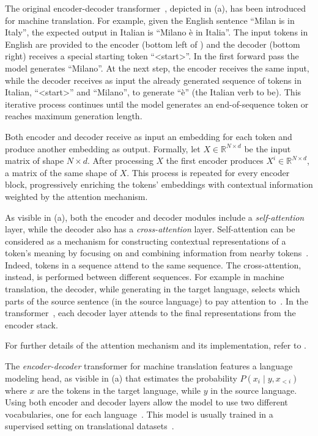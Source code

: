 The original encoder-decoder transformer~\cite{vaswani_transformers_2017}, depicted in (a), has been introduced for machine translation. For example, given the English sentence ``Milan is in Italy'', the expected output in Italian is ``Milano è in Italia''. 
The input tokens in English are provided to the encoder (bottom left of ) and the decoder (bottom right) receives a special starting token ``<start>''. In the first forward pass the model generates ``Milano''. At the next step, the encoder receives the same input, while the decoder receives as input the already generated sequence of tokens in Italian, ``<start>'' and ``Milano'', to generate ``è'' (the Italian verb to be). This iterative process continues until the model generates an end-of-sequence token or reaches maximum generation length.


Both encoder and decoder receive as input an embedding for each token and produce another embedding as output. Formally, let $X \in \mathbb{R}^{N \times d}$ be the input matrix of shape $N \times d$. After processing $X$ the first encoder produces $X^i \in \mathbb{R}^{N \times d}$, a matrix of the same shape of $X$. This process is repeated for every encoder block, progressively enriching the tokens' embeddings with contextual information weighted by the attention mechanism. 

As visible in (a), both the encoder and decoder modules include a \emph{self-attention} layer, while the decoder also has a \emph{cross-attention} layer.
Self-attention can be considered as a mechanism for constructing contextual representations of a token's meaning by focusing on and combining information from nearby tokens~\cite{jm3}. Indeed, tokens in a sequence attend to the same sequence.
The cross-attention, instead, is performed between different sequences. For example in machine translation, the decoder, while generating in the target language, selects which parts of the source sentence (in the source language) to pay attention to~\cite{bahdanau2015neural}. In the transformer~\cite{vaswani_transformers_2017}, each decoder layer attends to the final representations from the encoder stack.

For further details of the attention mechanism and its implementation, refer to \textcite{jm3}.


The \emph{encoder-decoder} transformer for machine translation features a language modeling head, as visible in (a) that estimates the probability $P(x_i \mid y,x_{<i})$ where $x$ are the tokens in the target language, while $y$ in the source language. Using both encoder and decoder layers allow the model to use two different vocabularies, one for each language~\cite{jm3}. This model is usually trained in a supervised setting on translational datasets~\cite{vaswani_transformers_2017}.

